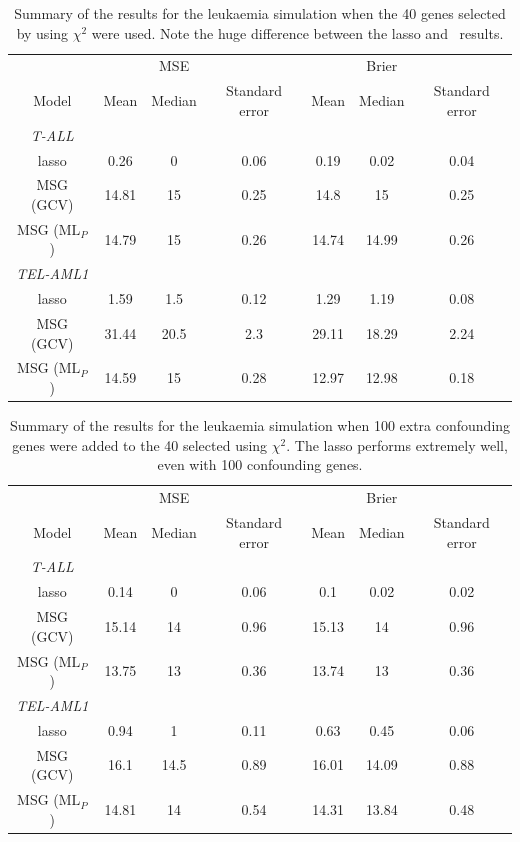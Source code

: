 \begin{table}  
\begin{centering}
\begin{tabular}{c || ccc | ccc}
    &  & MSE &  &  & Brier & \\ 
Model & Mean & Median & Standard error & Mean & Median & Standard error \\
\hline
\textit{T-ALL} & & & & & & \\
lasso &  0.26 & 0 & 0.06 & 0.19 & 0.02 & 0.04 \\
MSG (GCV) & 14.81 & 15 & 0.25 & 14.8 & 15 & 0.25 \\
MSG ($\text{ML}_P$) &  14.79 & 15 & 0.26 & 14.74 & 14.99 & 0.26 \\
\textit{TEL-AML1}  & & &  & & & \\
lasso &  1.59 & 1.5 & 0.12 & 1.29 & 1.19 & 0.08 \\
MSG (GCV) & 31.44 & 20.5 & 2.3 & 29.11 & 18.29 & 2.24 \\
MSG ($\text{ML}_P$) &  14.59 & 15 & 0.28 & 12.97 & 12.98 & 0.18 \\
  \end{tabular}
\caption{Summary of the results for the leukaemia simulation when the 40 genes selected by  using $\chi^2$ were used. Note the huge difference between the lasso and \mdsds\ results.}
\end{centering}
\label{leuk-sim}
\end{table}


\begin{table}  
\begin{centering}
\begin{tabular}{c || ccc | ccc}
    &  & MSE &  &  & Brier & \\ 
    Model & Mean & Median & Standard error & Mean & Median & Standard error \\
    \hline
\textit{T-ALL}  & & & & & & \\
lasso &  0.14 & 0 & 0.06 & 0.1 & 0.02 & 0.02 \\
MSG (GCV) & 15.14 & 14 & 0.96 & 15.13 & 14 & 0.96 \\
MSG ($\text{ML}_P$) &  13.75 & 13 & 0.36 & 13.74 & 13 & 0.36 \\
\textit{TEL-AML1}  & & & & & & \\
lasso &  0.94 & 1 & 0.11 & 0.63 & 0.45 & 0.06 \\
MSG (GCV) & 16.1 & 14.5 & 0.89 & 16.01 & 14.09 & 0.88 \\
MSG ($\text{ML}_P$) &  14.81 & 14 & 0.54 & 14.31 & 13.84 & 0.48 \\
  \end{tabular}
\caption{Summary of the results for the leukaemia simulation when 100 extra confounding genes were added to the 40 selected using $\chi^2$. The lasso performs extremely well, even with 100 confounding genes.}
\end{centering}
\label{leuk-confsim}
\end{table}


